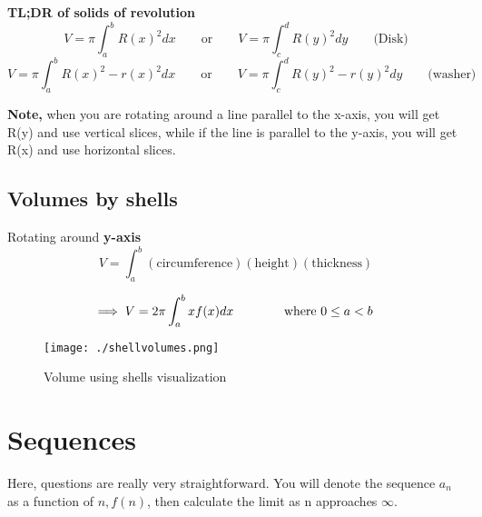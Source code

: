 \documentclass{article}
\begin{document}
\textbf{TL;DR of solids of revolution}
\[
	V = \pi \int^{b}_{a} R(x)^2 dx  \qquad \text{or} \qquad V = \pi \int^{d}_{c} R(y)^2 dy \qquad \text{(Disk)}
\]
\[
	V = \pi \int^{b}_{a} R(x)^2 - r(x)^2 dx \qquad \text{or} \qquad V = \pi \int^{d}_{c} R(y)^2 - r(y)^2 dy
	\qquad \text{(washer)}
\]

\textbf{Note,} when you are rotating around a line parallel to the x-axis, you will get R(y) and use vertical slices, while if the line is parallel to the y-axis, you will get R(x) and use horizontal slices. 


\newpage

\subsection{Volumes by shells}


Rotating around \textbf{y-axis}
\[
	V = \int^{b}_{a} (\text{circumference}) (\text{height}) (\text{thickness})  
\]

\[
\implies	V = 2\pi \int^{b}_{a} x f(x) dx \qquad \qquad \text{where $ 0 \leq a < b $ } 
\]

\begin{figure}[h!]
\centering
\texttt{[image: ./shellvolumes.png]}
\caption{Volume using shells visualization}
\label{fig:-shellvolumes-png}
\end{figure}	

\newpage

\section{Sequences}

Here, questions are really very straightforward. You will denote the sequence $ a_n $	as a function of $ n, f(n) $, then calculate the limit as n approaches $\infty$.
\end{document}

